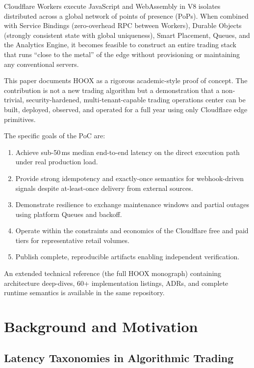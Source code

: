 \documentclass[10pt,a4paper]{article}
\newcommand{\textsc}[1]{\textsf{\small #1}}
\begin{document}
Cloudflare Workers execute JavaScript and WebAssembly in V8 isolates distributed across a global network of points of presence (PoPs). When combined with Service Bindings (zero-overhead RPC between Workers), Durable Objects (strongly consistent state with global uniqueness), Smart Placement, Queues, and the Analytics Engine, it becomes feasible to construct an entire trading stack that runs ``close to the metal'' of the edge without provisioning or maintaining any conventional servers.

This paper documents \textsc{HOOX} as a rigorous academic-style proof of concept. The contribution is not a new trading algorithm but a demonstration that a non-trivial, security-hardened, multi-tenant-capable trading operations center can be built, deployed, observed, and operated for a full year using only Cloudflare edge primitives.

The specific goals of the PoC are:
\begin{enumerate}
  \item Achieve sub-50\,ms median end-to-end latency on the direct execution path under real production load.
  \item Provide strong idempotency and exactly-once semantics for webhook-driven signals despite at-least-once delivery from external sources.
  \item Demonstrate resilience to exchange maintenance windows and partial outages using platform Queues and backoff.
  \item Operate within the constraints and economics of the Cloudflare free and paid tiers for representative retail volumes.
  \item Publish complete, reproducible artifacts enabling independent verification.
\end{enumerate}

An extended technical reference (the full HOOX monograph) containing architecture deep-dives, 60+ implementation listings, ADRs, and complete runtime semantics is available in the same repository.

\section{Background and Motivation}

\subsection{Latency Taxonomies in Algorithmic Trading}
\end{document}
